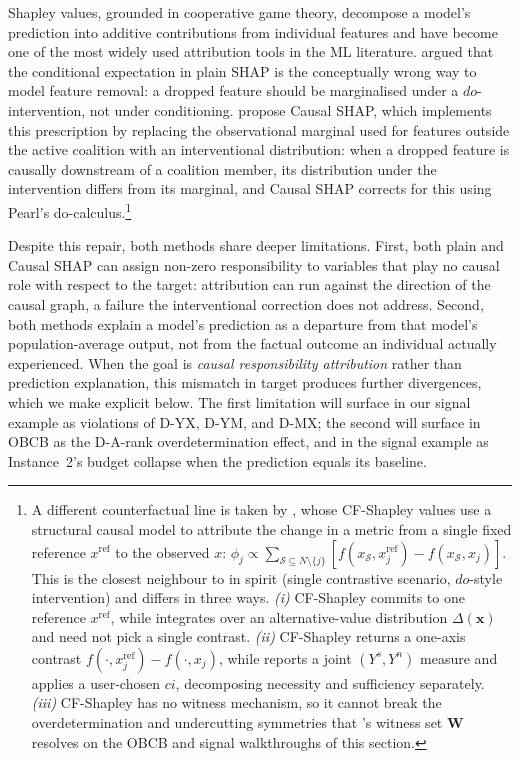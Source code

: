Shapley values, grounded in cooperative game theory, decompose a model's
prediction into additive contributions from individual features and have
become one of the most widely used attribution tools in the ML literature.
\citet{janzing2020feature} argued that the conditional expectation in plain SHAP is the
conceptually wrong way to model feature removal: a dropped feature should be
marginalised under a $do$-intervention, not under conditioning.
\citet{heskes2020causal} propose Causal SHAP, which implements this prescription by
replacing the observational marginal used for features outside the active coalition
with an interventional distribution: when a dropped feature is causally downstream of
a coalition member, its distribution under the intervention differs from its marginal,
and Causal SHAP corrects for this using Pearl's do-calculus.\footnote{%
A different counterfactual line is taken by \citet{sharma2022cfshapley}, whose
CF-Shapley values use a structural causal model to attribute the change in a metric
from a single fixed reference $x^{\text{ref}}$ to the observed $x$:
$\phi_j \propto \sum_{\mathcal{S}\subseteq N\setminus\{j\}}
[f(x_\mathcal{S}, x_j^{\text{ref}}) - f(x_\mathcal{S}, x_j)]$.
This is the closest neighbour to \ourapproach{} in spirit (single contrastive
scenario, $do$-style intervention) and differs in three ways.
\emph{(i)} CF-Shapley commits to one reference $x^{\text{ref}}$, while \ourapproach{}
integrates over an alternative-value distribution $\Delta(\mathbf{x})$ and need not pick
a single contrast.
\emph{(ii)} CF-Shapley returns a one-axis contrast
$f(\cdot, x_j^{\text{ref}}) - f(\cdot, x_j)$, while \ourapproach{} reports a joint
$(Y^s, Y^n)$ measure and applies a user-chosen $ci$, decomposing necessity and
sufficiency separately.
\emph{(iii)} CF-Shapley has no witness mechanism, so it cannot break the
overdetermination and undercutting symmetries that \ourapproach{}'s witness set
$\mathbf{W}$ resolves on the OBCB and signal walkthroughs of this section.}


Despite this repair, both methods share deeper limitations. First, both plain and
Causal SHAP can assign non-zero responsibility to variables that play no causal role
with respect to the target: attribution can run against the direction of the causal
graph, a failure the interventional correction does not address. Second, both methods explain a model's prediction as a departure from that model's population-average output, not from the factual outcome an individual actually experienced. When the goal is \emph{causal responsibility
attribution} rather than prediction explanation, this mismatch in target produces
further divergences, which we make explicit below. The first limitation will surface in our signal example as violations of
D-YX, D-YM, and D-MX; the second will surface in OBCB as the D-A-rank overdetermination
effect, and in the signal example as Instance~2's budget collapse when the prediction
equals its baseline.

